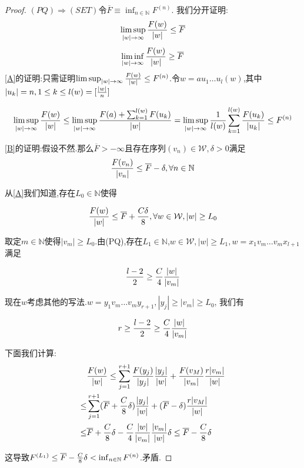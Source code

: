 \documentclass[a4paper,11pt,oneside]{book}
\begin{document}
\begin{proof}
$(PQ)\Rightarrow(SET)$令$\overline{F}\equiv \inf_{n\in\mathbb{N}}F^{(n)}$.
我们分开证明:
\begin{equation}
\label{A}
\limsup_{|w|\to \infty}{F(w)\over |w|}\leq \overline{F}
\end{equation}
\begin{equation}
\label{B}
\liminf_{|w|\to \infty}{F(w)\over |w|}\geq \overline{F}
\end{equation}
\ref{A}的证明:只需证明$\limsup_{|w|\to \infty}{F(w)\over |w|}\leq F^{(n)}$.令$w=au_1\ldots u_l(w)$,其中$|u_k|=n,1\leq k\leq l(w)=[{|w|\over n}]$

\begin{align*}
\limsup_{|w|\to \infty}{F(w)\over |w|}\leq \limsup_{|w|\to \infty}{F(a)+\sum_{k=1}^{l(w)} F(u_k)\over |w|}=\limsup_{|w|\to \infty} \frac{1}{l(w)}\sum_{k=1}^{l(w)}{ F(u_k)\over |u_k|} \leq F^{(n)}
\end{align*}

\ref{B}的证明:假设不然.那么$\overline{F}>-\infty$且存在序列$(v_n)\in\mathcal{W},\delta>0$满足$${F(v_n)\over |v_n|}\leq \overline{F}-\delta,\forall n\in\mathbb{N}$$

从\ref{A}我们知道,存在$L_0\in\mathbb{N}$使得

$${F(w)\over |w|}\leq \overline{F}+{C\delta\over 8},\forall w\in\mathcal{W},|w|\geq L_0$$

取定$m\in\mathbb{N}$使得$|v_m|\geq L_0$.由(PQ),存在$L_1\in\mathbb{N}$,$w\in\mathcal{W},|w|\geq L_1,w=x_1v_m\ldots v_mx_{l+1}$满足

$${l-2\over 2}\geq {C\over 4}{|w|\over |v_m|}$$ 

现在$w$考虑其他的写法.$w=y_1v_m\ldots v_my_{r+1},|y_j|\geq |v_m|\geq L_0$,
我们有

$$r\geq {l-2\over 2}\geq {C\over 4}{|w|\over |v_m|}$$

下面我们计算:
\begin{align*}
&{F(w)\over|w|}\leq \sum_{j=1}^{r+1}{F(y_j)\over |y_j|}{|y_j|\over |w|}+{F(v_M)\over |v_m|}{r|v_m|\over|w|}\\
\leq & \sum_{j=1}^{r+1}(\overline{F}+{C\over 8}\delta){|y_j|\over |w|}+(\overline{F}-\delta){r|v_M|\over |w|}\\
\leq &\overline{F} + {C\over 8}\delta -{C\over 4}{|w|\over |v_m|}{|v_m|\over |w|}\delta\leq \overline{F} - {C\over 8}\delta
\end{align*}

这导致$F^{(L_1)}\leq \overline{F}-{C\over 8}\delta<\inf_{n\in\mathbb{N}}F^{(n)}$.矛盾.


\end{proof}
\end{document}
